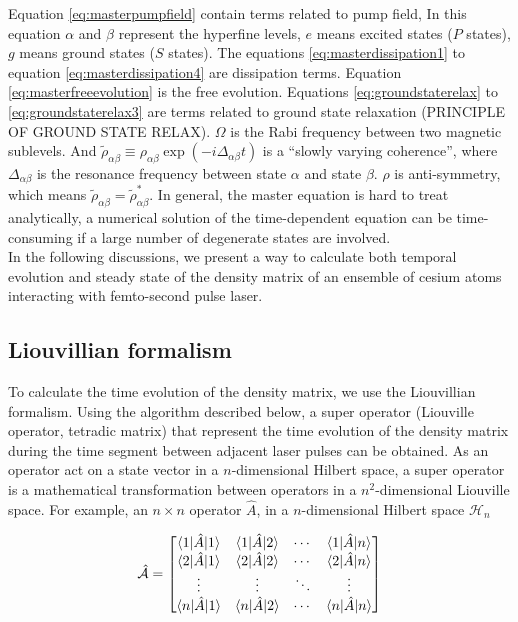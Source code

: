 \documentclass[11pt,a4paper]{article}
\begin{document}
Equation \ref{eq:masterpumpfield} contain terms related to pump field, In this equation $\alpha$ and $\beta$ represent the hyperfine levels, $e$ means excited states ($P$ states), $g$ means ground states ($S$ states). The equations \ref{eq:masterdissipation1} to equation \ref{eq:masterdissipation4} are dissipation terms. Equation \ref{eq:masterfreeevolution} is the free evolution. Equations \ref{eq:groundstaterelax} to \ref{eq:groundstaterelax3} are terms related to ground state relaxation (PRINCIPLE OF GROUND STATE RELAX). $\Omega$ is the Rabi frequency between two magnetic sublevels. And $\tilde{\rho}_{\alpha\beta} \equiv \rho_{\alpha\beta} \exp \left( -i \Delta_{\alpha\beta} t \right)$ is a ``slowly varying coherence'', where $\Delta_{\alpha\beta}$ is the resonance frequency between state $\alpha$ and state $\beta$. $\rho$ is anti-symmetry, which means $\tilde{\rho}_{\alpha\beta} = \tilde{\rho}^{\ast}_{\alpha\beta}$. In general, the master equation is hard to treat analytically, a numerical solution of the time-dependent equation can be time-consuming if a large number of degenerate states are involved.\\

In the following discussions, we present a way to calculate both temporal evolution and steady state of the density matrix of an ensemble of cesium atoms interacting with femto-second pulse laser.

\subsection{Liouvillian formalism}
To calculate the time evolution of the density matrix, we use the Liouvillian formalism. Using the algorithm described below, a super operator (Liouville operator, tetradic matrix) that represent the time evolution of the density matrix during the time segment between adjacent laser pulses can be obtained. As an operator act on a state vector in a $n$-dimensional Hilbert space, a super operator is a mathematical transformation between operators in a $n^{2}$-dimensional Liouville space. For example, an $n \times n$ operator $\hat{A}$, in a $n$-dimensional Hilbert space $\mathcal{H}_{n}$

\begin{equation}
\hat{\mathcal{A}} =
 \begin{bmatrix}
  \braket{ 1 | \hat{A}|1 } & \braket{ 1 | \hat{A}|2 } & \cdots & \braket{ 1 | \hat{A}|n } \\
  \braket{ 2 | \hat{A}|1 } & \braket{ 2 | \hat{A}|2 } & \cdots & \braket{ 2 | \hat{A}|n } \\
  \vdots  & \vdots  & \ddots & \vdots  \\
  \braket{ n | \hat{A}|1 } & \braket{ n | \hat{A}|2 } & \cdots & \braket{ n | \hat{A}|n }
 \end{bmatrix}
\end{equation}
\end{document}

